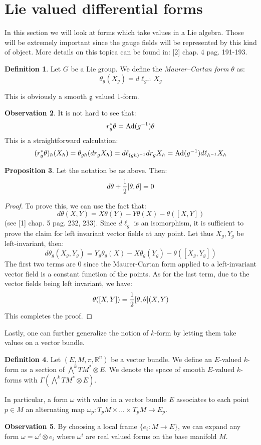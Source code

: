 \documentclass[12pt,a4paper]{report}
\theoremstyle{definition}
\newtheorem{Def}{Definition}[chapter]
\theoremstyle{Theorem}
\newtheorem{Prop}[Def]{Proposition}
\theoremstyle{definition}
\theoremstyle{definition}
\newtheorem{Obs}[Def]{Observation}
\begin{document}
	\section{Lie valued differential forms}
	In this section we will look at forms which take values in a Lie algebra. Those will be extremely important since the gauge fields will be represented by this kind of object.
	More details on this topica can be found in: [2] chap. 4 pag. 191-193.
	\begin{Def}
		Let $G$ be a Lie group. We define the \textit{Maurer–Cartan form} $\theta$ as:
		$$\theta_g(X_g)=d\ell_{g^{-1}}X_g$$
	\end{Def}
	This is obviously a smooth $\mathfrak{g}$ valued $1$-form.
	\begin{Obs}\label{Ex_3.4.2}
		It is not hard to see that:
		$$r_g^*\theta=\hbox{Ad}(g^{-1})\theta$$
		This is a straightforward calculation:
		$$(r_g^*\theta)_{h}(X_{h})=\theta_{gh}(dr_gX_h)=d\ell_{(gh)^{-1}}dr_gX_h=\hbox{Ad}(g^{-1})d\ell_{h^{-1}}X_h$$
	\end{Obs}
	\begin{Prop}
		Let the notation be as above. Then:
		$$d\theta+{1\over 2}[\theta,\theta]=0$$
	\end{Prop}
	\begin{proof}
		To prove this, we can use the fact that:
		$$d\theta(X,Y)=X\theta(Y)-Y\theta(X)-\theta([X,Y])$$
		(see [1] chap. 5 pag. 232, 233). Since $d\ell_g$ is an isomorphism, it is sufficient to prove the claim for left invariant vector fields at any point. Let thus $X_g,Y_g$ be left-invariant, then:
		$$d\theta_g(X_g,Y_g)=Y_g\theta_g(X)-X\theta_g(Y_g)-\theta([X_g,Y_g])$$
		The first two terms are 0 since the Maurer-Cartan form applied to a left-invariant vector field is a constant function of the points. As for the last term, due to the vector fields being left invariant, we have:
		$$\theta([X,Y])={1\over 2}[\theta,\theta](X,Y)$$
		This completes the proof.
	\end{proof}
	Lastly, one can further generalize the notion of $k$-form by letting them take values on a vector bundle.
	\begin{Def}
		Let $(E,M,\pi, \mathbb{R}^n)$ be a vector bundle. We define an $E$-valued $k$-form as a section of $\bigwedge^kTM^*\otimes E$. We denote the space of smooth $E$-valued $k$-forms with $\Gamma(\bigwedge^kTM^*\otimes E)$.
	\end{Def}
	In particular, a form $\omega$ with value in a vector bundle $E$ associates to each point $p\in M$ an alternating map $\omega_p:T_pM\times...\times T_pM\rightarrow E_p$.
	\begin{Obs}
		By choosing a local frame $\{e_i:M\rightarrow E\}$, we can expand any form $\omega=\omega^i\otimes e_i$ where $\omega^i$ are real valued forms on the base manifold $M$.
	\end{Obs}
\end{document}
